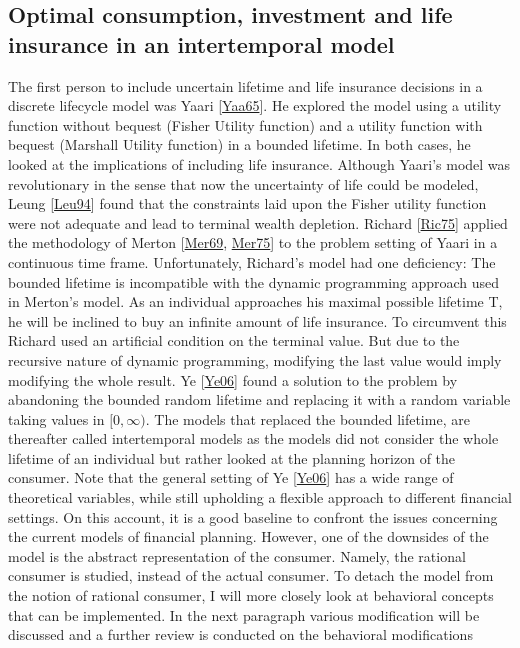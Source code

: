 \documentclass[letterpaper,10pt,english]{jupyterBook}
\begin{document}
\subsection{Optimal consumption, investment and life insurance in an intertemporal model}
\label{\detokenize{Financial_application:optimal-consumption-investment-and-life-insurance-in-an-intertemporal-model}}
\sphinxAtStartPar
The first person to include uncertain lifetime and life insurance decisions in a discrete life\sphinxhyphen{}cycle model was Yaari {[}\hyperlink{cite.Financial_application:id19}{Yaa65}{]}. He explored the model using a utility function without bequest (Fisher Utility function) and a utility function with bequest (Marshall Utility function) in a bounded lifetime. In both cases, he looked at the implications of including life insurance. Although Yaari’s model was revolutionary in the sense that now the uncertainty of life could be modeled, Leung {[}\hyperlink{cite.Financial_application:id23}{Leu94}{]} found that the constraints laid upon the Fisher utility function were not adequate and lead to terminal wealth depletion. Richard {[}\hyperlink{cite.Financial_application:id22}{Ric75}{]} applied the methodology of Merton {[}\hyperlink{cite.Financial_application:id20}{Mer69}, \hyperlink{cite.Financial_application:id21}{Mer75}{]} to the problem setting of Yaari in a continuous time frame. Unfortunately, Richard’s model had one deficiency: The bounded lifetime is incompatible with the dynamic programming approach used in Merton’s model. As an individual approaches his maximal possible lifetime T, he will be inclined to buy an infinite amount of life insurance. To circumvent this Richard used an artificial condition on the terminal value. But due to the recursive nature of dynamic programming, modifying the last value would imply modifying the whole result. Ye {[}\hyperlink{cite.Financial_application:id24}{Ye06}{]}  found a solution to the problem by abandoning the bounded random lifetime and replacing it with a random variable taking values in \([0,\infty)\). The models that replaced the bounded lifetime, are thereafter called intertemporal models as the models did not consider the whole lifetime of an individual but rather looked at the planning horizon of the consumer.  Note that the general setting of Ye {[}\hyperlink{cite.Financial_application:id24}{Ye06}{]} has a wide range of theoretical variables, while still upholding a flexible approach to different financial settings. On this account, it is a good baseline to confront the issues concerning the current models of financial planning. However, one of the downsides of the model is the abstract representation of the consumer. Namely, the rational consumer is studied, instead of the actual consumer. To detach the model from the notion of rational consumer, I will more closely look at behavioral concepts that can be implemented. In the next paragraph various modification will be discussed and a further review is conducted on the behavioral modifications
\end{document}
